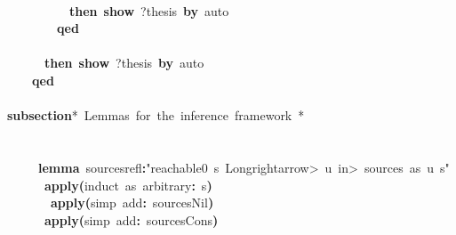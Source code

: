 \documentclass{article}
\newcommand{\syntaxCOMMENTC}[1]{\textcolor[rgb]{0.4,0.0,0.8}{#1}}
\newcommand{\syntaxKEYWORDA}[1]{\textcolor[rgb]{0.0,0.4,0.6}{\textbf{#1}}}
\newcommand{\syntaxKEYWORDC}[1]{\textcolor[rgb]{0.0,0.6,1.0}{\textbf{#1}}}
\newcommand{\syntaxLITERALA}[1]{\textcolor[rgb]{1.0,0.0,0.8}{#1}}
\newcommand{\syntaxOPERATOR}[1]{\textcolor[rgb]{0.0,0.0,0.0}{\textbf{#1}}}
\newcommand{\syntaxCOMMENTC}[1]{\textcolor[rgb]{0.4,0.0,0.8}{#1}}
\newcommand{\syntaxKEYWORDA}[1]{\textcolor[rgb]{0.0,0.4,0.6}{\textbf{#1}}}
\newcommand{\syntaxKEYWORDC}[1]{\textcolor[rgb]{0.0,0.6,1.0}{\textbf{#1}}}
\newcommand{\syntaxLITERALA}[1]{\textcolor[rgb]{1.0,0.0,0.8}{#1}}
\newcommand{\syntaxOPERATOR}[1]{\textcolor[rgb]{0.0,0.0,0.0}{\textbf{#1}}}
\newcommand{\syntaxCOMMENTC}[1]{\textcolor[rgb]{0.4,0.0,0.8}{#1}}
\newcommand{\syntaxKEYWORDA}[1]{\textcolor[rgb]{0.0,0.4,0.6}{\textbf{#1}}}
\newcommand{\syntaxKEYWORDC}[1]{\textcolor[rgb]{0.0,0.6,1.0}{\textbf{#1}}}
\newcommand{\syntaxLITERALA}[1]{\textcolor[rgb]{1.0,0.0,0.8}{#1}}
\newcommand{\syntaxOPERATOR}[1]{\textcolor[rgb]{0.0,0.0,0.0}{\textbf{#1}}}
\newcommand{\syntaxCOMMENTC}[1]{\textcolor[rgb]{0.4,0.0,0.8}{\textbf{#1}}}
\newcommand{\syntaxKEYWORDA}[1]{\textcolor[rgb]{0.0,0.4,0.6}{#1}}
\newcommand{\syntaxKEYWORDC}[1]{\textcolor[rgb]{0.0,0.6,1.0}{#1}}
\newcommand{\syntaxLITERALA}[1]{\textcolor[rgb]{1.0,0.0,0.8}{\textbf{#1}}}
\newcommand{\syntaxOPERATOR}[1]{\textcolor[rgb]{0.0,0.0,0.0}{#1}}
\newcommand{\syntaxCOMMENTC}[1]{\textcolor[rgb]{0.4,0.0,0.8}{#1}}
\newcommand{\syntaxKEYWORDA}[1]{\textcolor[rgb]{0.0,0.4,0.6}{\textbf{#1}}}
\newcommand{\syntaxKEYWORDC}[1]{\textcolor[rgb]{0.0,0.6,1.0}{\textbf{#1}}}
\newcommand{\syntaxLITERALA}[1]{\textcolor[rgb]{1.0,0.0,0.8}{#1}}
\newcommand{\syntaxOPERATOR}[1]{\textcolor[rgb]{0.0,0.0,0.0}{\textbf{#1}}}
\newcommand{\syntaxCOMMENTC}[1]{\textcolor[rgb]{0.4,0.0,0.8}{#1}}
\newcommand{\syntaxKEYWORDA}[1]{\textcolor[rgb]{0.0,0.4,0.6}{\textbf{#1}}}
\newcommand{\syntaxKEYWORDC}[1]{\textcolor[rgb]{0.0,0.6,1.0}{\textbf{#1}}}
\newcommand{\syntaxLITERALA}[1]{\textcolor[rgb]{1.0,0.0,0.8}{#1}}
\newcommand{\syntaxOPERATOR}[1]{\textcolor[rgb]{0.0,0.0,0.0}{\textbf{#1}}}
\begin{document}
{\ }{\ }{\ }{\ }{\ }{\ }{\ }{\ }{\ }{\ }{\ }{\ }\syntaxKEYWORDA{\usebox{\closecurlybracket}}\hspace*{\fill}\\
{\ }{\ }{\ }{\ }{\ }{\ }{\ }{\ }{\ }{\ }\syntaxKEYWORDA{then}{\ }\syntaxKEYWORDC{show}{\ }?thesis{\ }\syntaxKEYWORDA{by}{\ }auto\hspace*{\fill}\\
{\ }{\ }{\ }{\ }{\ }{\ }{\ }{\ }\syntaxKEYWORDA{qed}\hspace*{\fill}\\
{\ }{\ }{\ }{\ }{\ }{\ }{\ }{\ }\syntaxKEYWORDA{\usebox{\closecurlybracket}}\hspace*{\fill}\\
{\ }{\ }{\ }{\ }{\ }{\ }\syntaxKEYWORDA{then}{\ }\syntaxKEYWORDC{show}{\ }?thesis{\ }\syntaxKEYWORDA{by}{\ }auto\hspace*{\fill}\\
{\ }{\ }{\ }{\ }\syntaxKEYWORDA{qed}\hspace*{\fill}\\
\hspace*{\fill}\\
\syntaxKEYWORDA{subsection}\syntaxCOMMENTC{\usebox{\opencurlybracket}*{\ }Lemmas{\ }for{\ }the{\ }inference{\ }framework{\ }*\usebox{\closecurlybracket}}\hspace*{\fill}\\
\hspace*{\fill}\\
{\ }{\ }{\ }{\ }{\ }\hspace*{\fill}\\
{\ }{\ }{\ }{\ }{\ }\syntaxKEYWORDA{lemma}{\ }sources\usebox{\underscorebox}refl\syntaxOPERATOR{:}\syntaxLITERALA{"reachable0{\ }s{\ }\<Longrightarrow>{\ }u{\ }\<in>{\ }sources{\ }as{\ }u{\ }s"}\hspace*{\fill}\\
{\ }{\ }{\ }{\ }{\ }{\ }\syntaxKEYWORDA{apply}\syntaxOPERATOR{(}induct{\ }as{\ }arbitrary\syntaxOPERATOR{:}{\ }s\syntaxOPERATOR{)}\hspace*{\fill}\\
{\ }{\ }{\ }{\ }{\ }{\ }{\ }\syntaxKEYWORDA{apply}\syntaxOPERATOR{(}simp{\ }add\syntaxOPERATOR{:}{\ }sources\usebox{\underscorebox}Nil\syntaxOPERATOR{)}\hspace*{\fill}\\
{\ }{\ }{\ }{\ }{\ }{\ }\syntaxKEYWORDA{apply}\syntaxOPERATOR{(}simp{\ }add\syntaxOPERATOR{:}{\ }sources\usebox{\underscorebox}Cons\syntaxOPERATOR{)}{\ }\hspace*{\fill}\\
\end{document}
